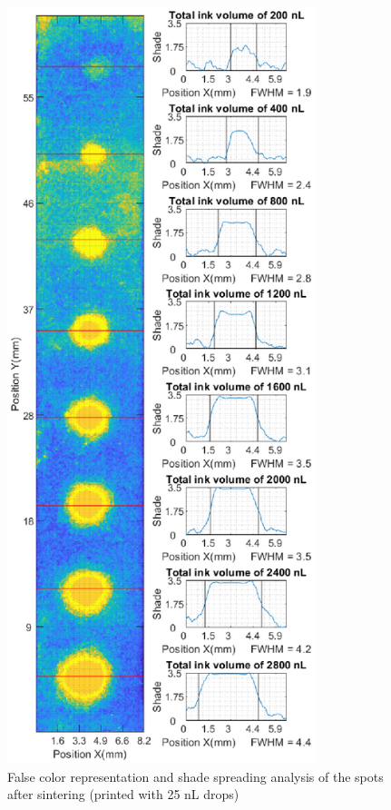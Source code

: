 \begin{figure}[H]
	\centering
	\includegraphics[width=0.8\textwidth]{grafiken/drops25.eps}
	\caption{False color representation and shade spreading analysis of the spots after sintering (printed with 25 nL drops)}
	\label{fig:drops25}
\end{figure} 

